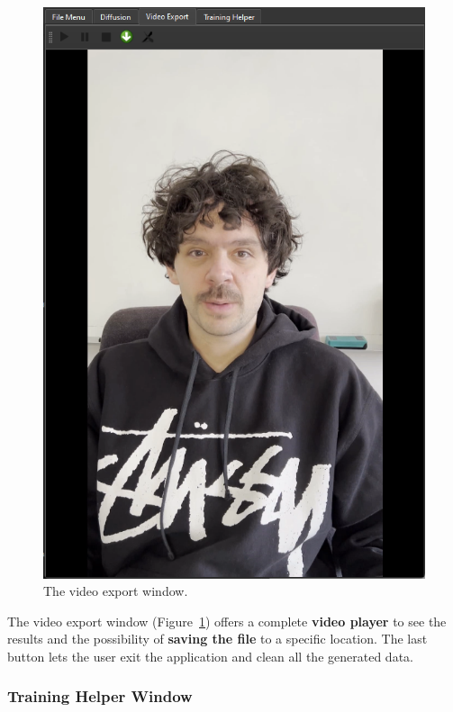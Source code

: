 \documentclass[preprint]{elsarticle}
\begin{document}
\begin{figure}[H]
	\centering
	\includegraphics[scale=0.3, keepaspectratio]{img/project_img/video-window.png}
	\caption{The video export window.}
	\label{fig:video-player}
\end{figure}

The video export window (Figure~\ref{fig:video-player}) offers a complete \textbf{video player} 
to see the results and the possibility of \textbf{saving the file} to a specific location. 
The last button lets the user exit the application and clean all the generated data.


\subsubsection{Training Helper Window}
\end{document}
